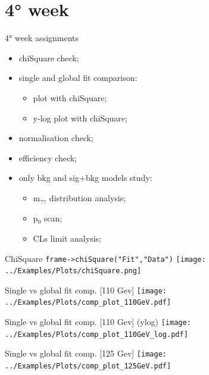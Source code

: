 \documentclass[10pt,UKenglish, leqno, xcolor = dvipsnames]{beamer}
\begin{document}
	\section{4° week}
	\SectionPage
	
		\begin{frame}{4° week assignments}
			\vfill
			\begin{itemize}
				\item chiSquare check;
				\item single and global fit comparison:
				\begin{itemize}
					\item plot with chiSquare;
					\item y-log plot with chiSquare; 
				\end{itemize}
				\item normalisation check;
				\item efficiency check;
				\item only bkg and sig+bkg models study:
				\begin{itemize}
					\item m$_{\gamma\gamma}$ distribution analysis;
					\item p$_0$ scan;
					\item CLs limit analysis;
				\end{itemize}
			\end{itemize}
			\vfill
		\end{frame}
	
		\begin{frame}{ChiSquare}
			\vfill
			\centering
			\texttt{frame->chiSquare("Fit","Data")}
			\texttt{[image: ../Examples/Plots/chiSquare.png]}
			\vfill
		\end{frame}
	
		\begin{frame}{Single vs global fit comp. [110 Gev]}
			\vfill
			\texttt{[image: ../Examples/Plots/comp\_plot\_110GeV.pdf]}
			\vfill
		\end{frame}
	
		\begin{frame}{Single vs global fit comp. [110 Gev] (ylog)}
			\vfill
			\texttt{[image: ../Examples/Plots/comp\_plot\_110GeV\_log.pdf]}
			\vfill
		\end{frame}
	
		\begin{frame}{Single vs global fit comp. [125 Gev]}
			\vfill
			\texttt{[image: ../Examples/Plots/comp\_plot\_125GeV.pdf]}
			\vfill
		\end{frame}
		
\end{document}
